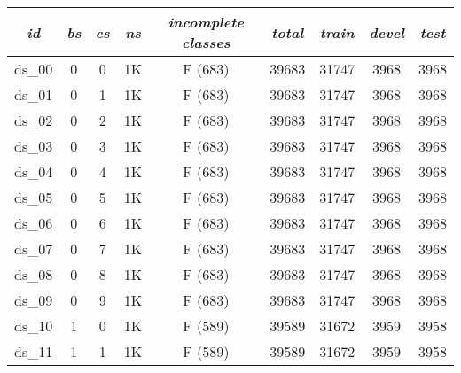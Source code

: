 \begin{footnotesize}
\begin{longtable}{|c|c|c|c|c|c|c|c|c|}
\hline
\textit{id} & \textit{bs} & \textit{cs} & \textit{ns} & \textit{incomplete classes} & \textit{total} & \textit{train} & \textit{devel} & \textit{test} \\ \hline
\endhead
ds\_00      & 0           & 0           & 1K        & F (683)                     & 39683         & 31747          & 3968           & 3968          \\ \hline
ds\_01      & 0           & 1           & 1K        & F (683)                     & 39683         & 31747          & 3968           & 3968          \\ \hline
ds\_02      & 0           & 2           & 1K        & F (683)                     & 39683         & 31747          & 3968           & 3968          \\ \hline
ds\_03      & 0           & 3           & 1K        & F (683)                     & 39683         & 31747          & 3968           & 3968          \\ \hline
ds\_04      & 0           & 4           & 1K        & F (683)                     & 39683         & 31747          & 3968           & 3968          \\ \hline
ds\_05      & 0           & 5           & 1K        & F (683)                     & 39683         & 31747          & 3968           & 3968          \\ \hline
ds\_06      & 0           & 6           & 1K        & F (683)                     & 39683         & 31747          & 3968           & 3968          \\ \hline
ds\_07      & 0           & 7           & 1K        & F (683)                     & 39683         & 31747          & 3968           & 3968          \\ \hline
ds\_08      & 0           & 8           & 1K        & F (683)                     & 39683         & 31747          & 3968           & 3968          \\ \hline
ds\_09      & 0           & 9           & 1K        & F (683)                     & 39683         & 31747          & 3968           & 3968          \\ \hline
ds\_10      & 1           & 0           & 1K        & F (589)                     & 39589         & 31672          & 3959           & 3958          \\ \hline
ds\_11      & 1           & 1           & 1K        & F (589)                     & 39589         & 31672          & 3959           & 3958          \\ \hline

\end{longtable}
\end{footnotesize}
